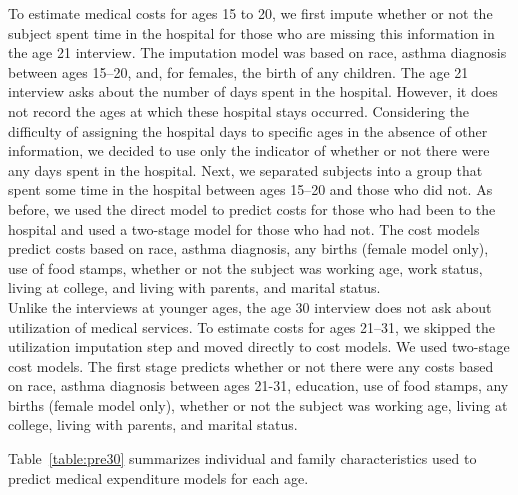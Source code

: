 \noindent To estimate medical costs for ages 15 to 20, we first impute whether or not the subject spent time in the hospital for those who are missing this information in the age 21 interview. The imputation model was based on race, asthma diagnosis between ages 15--20, and, for females, the birth of any children. The age 21 interview asks about the number of days spent in the hospital. However, it does not record the ages at which these hospital stays occurred. Considering the difficulty of assigning the hospital days to specific ages in the absence of other information, we decided to use only the indicator of whether or not there were any days spent in the hospital. Next, we separated subjects into a group that spent some time in the hospital between ages 15--20 and those who did not. As before, we used the direct model to predict costs for those who had been to the hospital and used a two-stage model for those who had not. The cost models predict costs based on race, asthma diagnosis, any births (female model only), use of food stamps, whether or not the subject was working age, work status, living at college, and living with parents, and marital status.\\

\noindent Unlike the interviews at younger ages, the age 30 interview does not ask about utilization of medical services. To estimate costs for ages 21--31, we skipped the utilization imputation step and moved directly to cost models. We used two-stage cost models. The first stage predicts whether or not there were any costs based on race, asthma diagnosis between ages 21-31, education, use of food stamps, any births (female model only), whether or not the subject was working age, living at college, living with parents, and marital status.

\noindent Table~\ref{table:pre30} summarizes individual and family characteristics used to predict medical expenditure models for each age.

